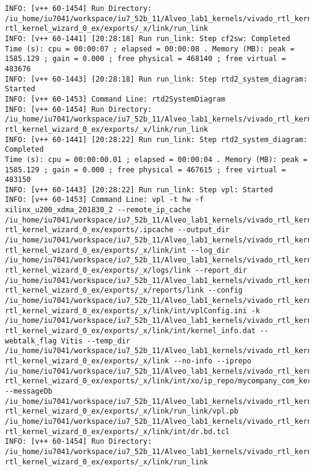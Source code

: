 \begin{lstlisting}[label=code:log_file, caption=Содержимое log-файла, basicstyle=\tiny]
INFO: [v++ 60-1454] Run Directory: /iu_home/iu7041/workspace/iu7_52b_11/Alveo_lab1_kernels/vivado_rtl_kernel/  rtl_kernel_wizard_0_ex/exports/_x/link/run_link
INFO: [v++ 60-1441] [20:28:18] Run run_link: Step cf2sw: Completed
Time (s): cpu = 00:00:07 ; elapsed = 00:00:08 . Memory (MB): peak = 1585.129 ; gain = 0.000 ; free physical = 468140 ; free virtual = 483676
INFO: [v++ 60-1443] [20:28:18] Run run_link: Step rtd2_system_diagram: Started
INFO: [v++ 60-1453] Command Line: rtd2SystemDiagram
INFO: [v++ 60-1454] Run Directory: /iu_home/iu7041/workspace/iu7_52b_11/Alveo_lab1_kernels/vivado_rtl_kernel/  rtl_kernel_wizard_0_ex/exports/_x/link/run_link
INFO: [v++ 60-1441] [20:28:22] Run run_link: Step rtd2_system_diagram: Completed
Time (s): cpu = 00:00:00.01 ; elapsed = 00:00:04 . Memory (MB): peak = 1585.129 ; gain = 0.000 ; free physical = 467615 ; free virtual = 483150
INFO: [v++ 60-1443] [20:28:22] Run run_link: Step vpl: Started
INFO: [v++ 60-1453] Command Line: vpl -t hw -f xilinx_u200_xdma_201830_2 --remote_ip_cache /iu_home/iu7041/workspace/iu7_52b_11/Alveo_lab1_kernels/vivado_rtl_kernel/ rtl_kernel_wizard_0_ex/exports/.ipcache --output_dir /iu_home/iu7041/workspace/iu7_52b_11/Alveo_lab1_kernels/vivado_rtl_kernel/ rtl_kernel_wizard_0_ex/exports/_x/link/int --log_dir /iu_home/iu7041/workspace/iu7_52b_11/Alveo_lab1_kernels/vivado_rtl_kernel/ rtl_kernel_wizard_0_ex/exports/_x/logs/link --report_dir /iu_home/iu7041/workspace/iu7_52b_11/Alveo_lab1_kernels/vivado_rtl_kernel/ rtl_kernel_wizard_0_ex/exports/_x/reports/link --config /iu_home/iu7041/workspace/iu7_52b_11/Alveo_lab1_kernels/vivado_rtl_kernel/ rtl_kernel_wizard_0_ex/exports/_x/link/int/vplConfig.ini -k /iu_home/iu7041/workspace/iu7_52b_11/Alveo_lab1_kernels/vivado_rtl_kernel/ rtl_kernel_wizard_0_ex/exports/_x/link/int/kernel_info.dat --webtalk_flag Vitis --temp_dir /iu_home/iu7041/workspace/iu7_52b_11/Alveo_lab1_kernels/vivado_rtl_kernel/ rtl_kernel_wizard_0_ex/exports/_x/link --no-info --iprepo   /iu_home/iu7041/workspace/iu7_52b_11/Alveo_lab1_kernels/vivado_rtl_kernel/ rtl_kernel_wizard_0_ex/exports/_x/link/int/xo/ip_repo/mycompany_com_kernel_rtl_kernel_wizard_0_1_0 --messageDb /iu_home/iu7041/workspace/iu7_52b_11/Alveo_lab1_kernels/vivado_rtl_kernel/ rtl_kernel_wizard_0_ex/exports/_x/link/run_link/vpl.pb /iu_home/iu7041/workspace/iu7_52b_11/Alveo_lab1_kernels/vivado_rtl_kernel/ rtl_kernel_wizard_0_ex/exports/_x/link/int/dr.bd.tcl
INFO: [v++ 60-1454] Run Directory: /iu_home/iu7041/workspace/iu7_52b_11/Alveo_lab1_kernels/vivado_rtl_kernel/ rtl_kernel_wizard_0_ex/exports/_x/link/run_link


\end{lstlisting}
